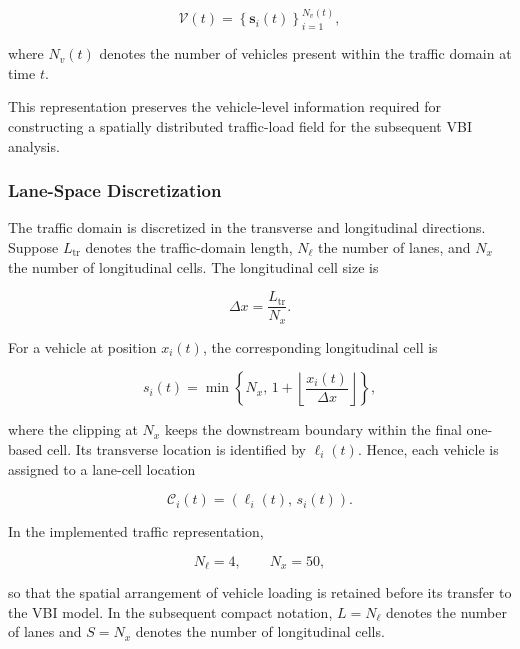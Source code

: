 \documentclass[journal]{IEEEtran}
\begin{document}
\begin{equation}
\mathcal{V}(t)
=
\left\{
\mathbf{s}_{i}(t)
\right\}_{i=1}^{N_v(t)},
\label{eq:vehicle_set}
\end{equation}

where $N_v(t)$ denotes the number of vehicles present within the traffic domain at time $t$.

This representation preserves the vehicle-level information required for constructing a spatially distributed traffic-load field for the subsequent VBI analysis.


\subsubsection{Lane-Space Discretization}
\label{subsec:lane_space}

The traffic domain is discretized in the transverse and longitudinal directions. Suppose $L_{\mathrm{tr}}$ denotes the traffic-domain length, $N_{\ell}$ the number of lanes, and $N_x$ the number of longitudinal cells. The longitudinal cell size is

\begin{equation}
\Delta x
=
\frac{L_{\mathrm{tr}}}{N_x}.
\label{eq:cell_size}
\end{equation}

For a vehicle at position $x_i(t)$, the corresponding longitudinal cell is

\begin{equation}
s_i(t)
=
\min\left\{
N_x,\,
1+\left\lfloor
\frac{x_i(t)}{\Delta x}
\right\rfloor
\right\},
\label{eq:cell_index}
\end{equation}

where the clipping at $N_x$ keeps the downstream boundary within the final one-based cell. Its transverse location is identified by $\ell_i(t)$. Hence, each vehicle is assigned to a lane-cell location

\begin{equation}
\mathcal{C}_i(t)
=
\left(
\ell_i(t),\,s_i(t)
\right).
\label{eq:lane_cell_location}
\end{equation}

In the implemented traffic representation,

\begin{equation}
N_{\ell}=4,
\qquad
N_x=50,
\label{eq:grid_configuration}
\end{equation}

so that the spatial arrangement of vehicle loading is retained before its transfer to the VBI model. In the subsequent compact notation, $L=N_{\ell}$ denotes the number of lanes and $S=N_x$ denotes the number of longitudinal cells.
\end{document}

